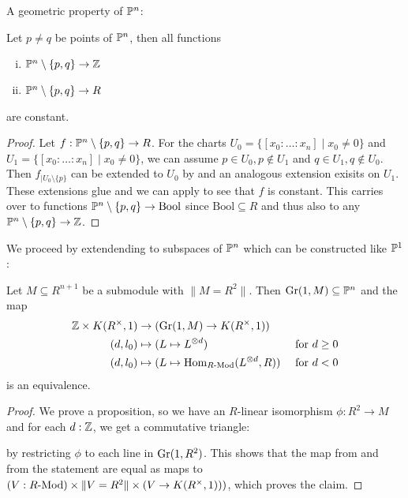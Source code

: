 A geometric property of $\mathbb{P}^n$:

\begin{lemma}\label{constant-functions-Pn-minus-points}
  Let $p\neq q$ be points of $\mathbb{P}^n$, then all functions
  \begin{center}
  \begin{enumerate}[(i)]
  \item $\mathbb{P}^n\setminus\{p,q\}\to \mathbb{Z}$
  \item $\mathbb{P}^n\setminus\{p,q\}\to R$
  \end{enumerate}
  \end{center}
  are constant.
\end{lemma}

\begin{proof}
  Let $f:\mathbb{P}^n\setminus\{p,q\}\to R$.
  For the charts $U_0=\{[x_0:\dots:x_n]\mid x_0\neq 0\}$ and $U_1=\{[x_0:\dots:x_n]\mid x_0\neq 0\}$, we can assume $p\in U_0, p\notin U_1$ and $q\in U_1, q\notin U_0$.
  Then $f_{|U_0\setminus\{p\}}$ can be extended to $U_0$ by  and an analogous extension exisits on $U_1$.
    These extensions glue and we can apply  to see that $f$ is constant.
    This carries over to functions $\mathbb{P}^n\setminus\{p,q\}\to \mathrm{Bool}$ since $\mathrm{Bool}\subseteq R$ and thus also to any $\mathbb{P}^n\setminus\{p,q\}\to \mathbb{Z}$.
\end{proof}
We proceed by extendending  to subspaces of $\mathbb{P}^n$ which can be constructed like $\mathbb{P}^1$:

\begin{lemma}\label{line-bundle-on-line}
  Let $M\subseteq R^{n+1}$ be a submodule with $\|M=R^2\|$.
  Then $\mathrm{Gr}(1,M)\subseteq \mathbb{P}^n$ and the map
  \begin{align*}
    \mathbb{Z}\times K(R^{\times},1) &\to (\mathrm{Gr}(1,M)\to K(R^{\times},1)) &\\
    (d,l_0) &\mapsto (L\mapsto L^{\otimes d}) &\text{ for $d\geq 0$} \\
    (d,l_0) &\mapsto (L\mapsto \mathrm{Hom}_{R\text{-}\mathrm{Mod}}(L^{\otimes d},R)) &\text{ for $d< 0$} 
  \end{align*}
  is an equivalence.
\end{lemma}

\begin{proof}
  We prove a proposition, so we have an $R$-linear isomorphism $\phi:R^2\to M$ and for each $d:\mathbb{Z}$, we get a commutative triangle:
  \begin{center}
\end{center}
by restricting $\phi$ to each line in $\mathrm{Gr}(1,R^2)$.
This shows that the map from  and from the statement are equal as maps to $(V:R\text{-}\mathrm{Mod})\times \|V=R^2\| \times (V\to K(R^{\times},1)))$,
which proves the claim.
\end{proof}

